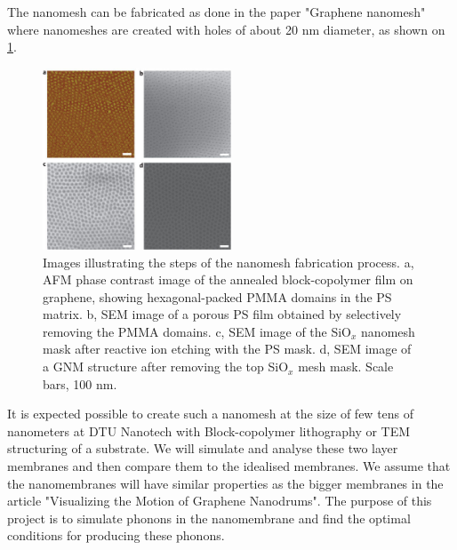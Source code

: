 The nanomesh can be fabricated as done in the paper "Graphene nanomesh"\cite{Bai2010} where nanomeshes are created with holes of about 20 nm diameter, as shown on \cref{plz}.
\begin{figure}
    \centering
    \includegraphics[width=0.5\textwidth]{Figures/plz.eps}
    \caption{Images illustrating the steps of the nanomesh fabrication process. a, AFM phase contrast image of the annealed block-copolymer film on graphene, showing hexagonal-packed PMMA domains in the PS matrix. b, SEM image of a porous PS film obtained by selectively removing the PMMA domains. c, SEM image of the SiO$_x$ nanomesh mask after reactive ion etching with the PS mask. d, SEM image of a GNM structure after removing the top SiO$_x$ mesh mask. Scale bars, 100 nm.\cite{Bai2010}}
    \label{plz}
\end{figure}
It is expected possible to create such a nanomesh at the
size of few tens of nanometers at DTU Nanotech with Block-copolymer lithography or TEM
structuring of a substrate.
We will simulate and analyse these two layer membranes and then compare them to the idealised membranes.
We assume that the nanomembranes will have similar properties as the bigger membranes in the article "Visualizing the Motion of Graphene Nanodrums"\cite[Fig 3]{Davidovikj2016}.
The purpose of this project is to
simulate phonons in the nanomembrane and find the optimal conditions for producing these phonons.

